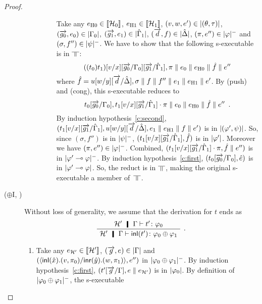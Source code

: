 \begin{proof}
\begin{description}
\begin{enumerate}[label=\textit{(\arabic{*})}]
\begin{description}
		     Take any
		     $e_{\mathrm{H0}}\in\llbracket{\mathcal H_0}\rrbracket$,
		     $e_{\mathrm{H1}}\in\llbracket{\mathcal H_1}\rrbracket$,
		     $(v,w,e')\in|{(\theta,\tau)}|$,
		     $(\overrightarrow{g_0},{e_0})\in|{\Gamma_0}|$,
		     $(\overrightarrow{g_1},{e_1})\in|{\hat{\Gamma}_1}|$,
		     $(\overrightarrow{d},{f})\in|{\hat{\Delta}}|$,
		     $(\pi,e'')\in|{\varphi}|^-$ and
		     $(\sigma,f'')\in|{\psi}|^-$.
		     We have to show that the following s-executable is in $\bbot$:
		     \[
		     ((t_0)t_1)[v/x][\overrightarrow{g_0}/\Gamma_0][\overrightarrow{g_1}/\hat{\Gamma}_1],\pi\parallel
		     {e_0\parallel e_{\mathrm{H0}}}
		     \parallel\hat{f}\parallel
		     e''
		     \]
		     where
		     $\hat f = u[w/y][\overrightarrow{d}/\hat{\Delta}],\sigma\parallel
		     {f}\parallel f''\parallel {e_1\parallel e_{\mathrm{H1}}}\parallel e'$.
		     By (push) and (cong), this s-executable reduces
		     to
		     \[
		     t_0[\overrightarrow{g_0}/\Gamma_0],t_1[v/x][\overrightarrow{g_1}/\hat{\Gamma}_1]\cdot \pi\parallel
		     {e_0\parallel e_{\mathrm{H0}}}
		     \parallel\hat{f}\parallel
		     e''\enspace.
		     \]
		     By induction hypothesis~\ref{c:second},
		     $(t_1[v/x][\overrightarrow{g_1}/\hat{\Gamma}_1],
		     u[w/y][\overrightarrow{d}/\hat{\Delta}], {e_1\parallel e_{\mathrm{H1}}}\parallel {f}\parallel
		     e')$ is in $|{(\varphi',\psi)}|$.
		     So, since $(\sigma,f'')$ is in $|{\psi}|^-$,
		     $(t_1[v/x][\overrightarrow{g_1}/\hat{\Gamma}_1],\hat f)$ is in
		     $|{\varphi'}|$.
		     Moreover we have $(\pi,e'')\in|{\varphi}|^-$.
		     Combined,
		     $(t_1[v/x][\overrightarrow{g_1}/\hat{\Gamma}_1]\cdot\pi,\hat f\parallel e'')$
		     is in $|{\varphi'\multimap\varphi}|^-$\kern -1pt.
		     By induction hypothesis~\ref{c:first},
		     $(t_0[\overrightarrow{g_0}/\Gamma_0],\hat e)$ is in
		     $|{\varphi'\multimap\varphi}|$.
		     So, the reduct is in $\bbot$, making the original
		     s-executable a member of~$\bbot$.
	       \end{description}
	\end{enumerate}
   \item[($\oplus$I, \textminus)]
       Without loss of generality, we assume that the
       derivation for $t$ ends as
       \[
       \aseq{\hyp{'}\G}{\tj{t'}{\phi_0}}
       \useq{\hyp{'}\G}{\tj{\inl{t'}}{\phi_0\oplus\phi_1}}
       \DisplayProof\enspace.
       \]
       \begin{enumerate}[label=\textit{(\arabic{*})}]
        \item Take any
	      $e_{\mathcal{H}'}\in \llbracket{\mathcal{H}'}\rrbracket$,
	      $(\overrightarrow g, e)\in|{\Gamma}|$ and
              $(\langle \mathsf{inl}({\hat x}). ({v},{\pi_0})/ \mathsf{inr}({\hat y}). ({w},{\pi_1})\rangle, e'')$
              in $|{\varphi_0\oplus\varphi_1}|^-$.
              By induction hypothesis~\ref{c:first},
              $(t'[\overrightarrow g/\Gamma], e\parallel e_{\mathcal H'})$ is in
	      $|{\varphi_0}|$.
              By definition of $|{\varphi_0\oplus\varphi_1}|^-$,
              the s-executable

\end{enumerate}
\end{description}
\end{proof}
